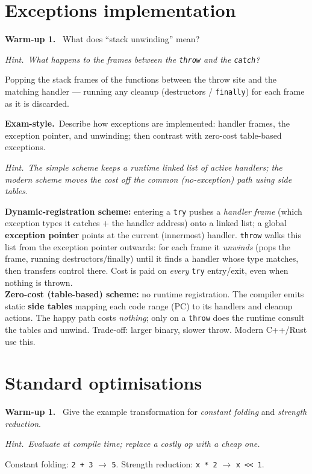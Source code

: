 \documentclass[11pt,a4paper]{article}
\newcommand{\hint}[1]{\par{\small\textcolor{accent}{\textit{Hint.}}\ \textit{#1}}\par\smallskip}
\newcommand{\warm}[1]{\smallskip\textbf{\textcolor{hi}{Warm-up #1.}}\ }
\newcommand{\exam}{\smallskip\textbf{\textcolor{warn}{Exam-style.}}\ }
\begin{document}
\section{Exceptions implementation}

\warm{1} What does ``stack unwinding'' mean?
\hint{What happens to the frames between the \texttt{throw} and the \texttt{catch}?}
\begin{sol}
Popping the stack frames of the functions between the throw site and the matching handler --- running any cleanup (destructors / \texttt{finally}) for each frame as it is discarded.
\end{sol}

\exam Describe how exceptions are implemented: handler frames, the exception pointer, and unwinding; then contrast with zero-cost table-based exceptions.
\hint{The simple scheme keeps a runtime linked list of active handlers; the modern scheme moves the cost off the common (no-exception) path using side tables.}
\begin{sol}
\textbf{Dynamic-registration scheme:} entering a \texttt{try} pushes a \emph{handler frame} (which exception types it catches $+$ the handler address) onto a linked list; a global \textbf{exception pointer} points at the current (innermost) handler. \texttt{throw} walks this list from the exception pointer outwards: for each frame it \emph{unwinds} (pops the frame, running destructors/finally) until it finds a handler whose type matches, then transfers control there. Cost is paid on \emph{every} \texttt{try} entry/exit, even when nothing is thrown.\\[2pt]
\textbf{Zero-cost (table-based) scheme:} no runtime registration. The compiler emits static \textbf{side tables} mapping each code range (PC) to its handlers and cleanup actions. The happy path costs \emph{nothing}; only on a \texttt{throw} does the runtime consult the tables and unwind. Trade-off: larger binary, slower throw. Modern C++/Rust use this.
\end{sol}

\section{Standard optimisations}

\warm{1} Give the example transformation for \emph{constant folding} and \emph{strength reduction}.
\hint{Evaluate at compile time; replace a costly op with a cheap one.}
\begin{sol}
Constant folding: \texttt{2 + 3} $\to$ \texttt{5}. \quad Strength reduction: \texttt{x * 2} $\to$ \texttt{x << 1}.
\end{sol}
\end{document}
